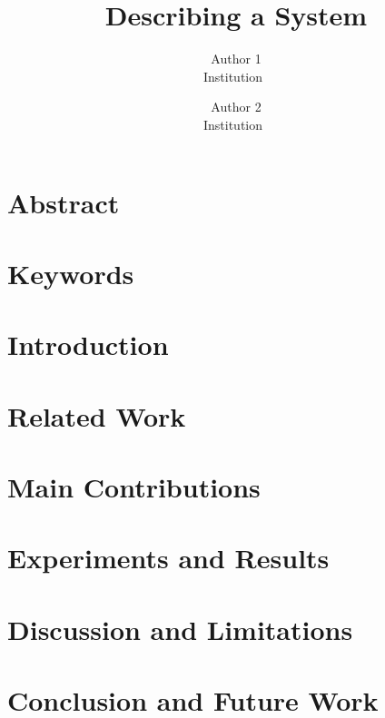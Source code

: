 \documentclass[letterpaper,twocolumn,10pt]{article}
\begin{document}

\date{}

\title{\Large \bf Describing a System}

\author{
{\rm Author 1} \\
Institution~\cite{rupp_game_2025}
\and
{\rm Author 2} \\
Institution~\cite{rupp_geevo_2024}
} %

\maketitle

\section{Abstract}

\section{Keywords}

\section{Introduction}

\section{Related Work}

\section{Main Contributions}

\section{Experiments and Results}

\section{Discussion and Limitations}

\section{Conclusion and Future Work}




\end{document}

